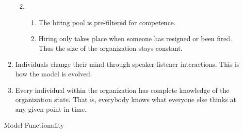\documentclass[]{article}
\providecommand{\tightlist}{%
  \setlength{\itemsep}{0pt}\setlength{\parskip}{0pt}}
\begin{document}
\begin{enumerate}
  \begin{enumerate}
  \def\labelenumii{\arabic{enumii}.}
  \setcounter{enumii}{1}
  \item
    \begin{enumerate}
    \def\labelenumiii{\arabic{enumiii}.}
    \setcounter{enumiii}{2}
    \tightlist
    \item
      The hiring pool is pre-filtered for competence.\\
    \item
      Hiring only takes place when someone has resigned or been fired.
      Thus the size of the organization stays constant.
    \end{enumerate}
  \end{enumerate}
\item
  Individuals change their mind through speaker-listener interactions.
  This is how the model is evolved.\\
\item
  Every individual within the organization has complete knowledge of the
  organization state. That is, everybody knows what everyone else thinks
  at any given point in time.
\end{enumerate}

Model Functionality
\end{document}
